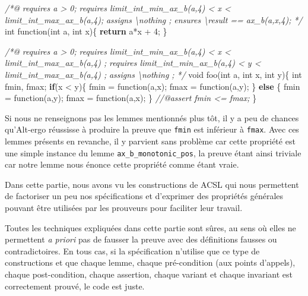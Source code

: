 \documentclass[12pt,francais,]{scrbook}
\newenvironment{Shaded}{}{}
\newcommand{\KeywordTok}[1]{\textcolor[rgb]{0.00,0.44,0.13}{\textbf{{#1}}}}
\newcommand{\DataTypeTok}[1]{\textcolor[rgb]{0.56,0.13,0.00}{{#1}}}
\newcommand{\DecValTok}[1]{\textcolor[rgb]{0.25,0.63,0.44}{{#1}}}
\newcommand{\CommentTok}[1]{\textcolor[rgb]{0.38,0.63,0.69}{\textit{{#1}}}}
\newcommand{\NormalTok}[1]{{#1}}
\begin{document}
\begin{footnotesize}\begin{Shaded}
\begin{Highlighting}[]
\CommentTok{/*@}
\CommentTok{  requires a > 0;}
\CommentTok{  requires limit_int_min_ax_b(a,4) < x < limit_int_max_ax_b(a,4);}
\CommentTok{  assigns \textbackslash{}nothing ;}
\CommentTok{  ensures \textbackslash{}result == ax_b(a,x,4);}
\CommentTok{*/}
\DataTypeTok{int} \NormalTok{function(}\DataTypeTok{int} \NormalTok{a, }\DataTypeTok{int} \NormalTok{x)\{}
  \KeywordTok{return} \NormalTok{a*x + }\DecValTok{4}\NormalTok{;}
\NormalTok{\}}

\CommentTok{/*@ }
\CommentTok{  requires a > 0;}
\CommentTok{  requires limit_int_min_ax_b(a,4) < x < limit_int_max_ax_b(a,4) ;}
\CommentTok{  requires limit_int_min_ax_b(a,4) < y < limit_int_max_ax_b(a,4) ;}
\CommentTok{  assigns \textbackslash{}nothing ;}
\CommentTok{*/}
\DataTypeTok{void} \NormalTok{foo(}\DataTypeTok{int} \NormalTok{a, }\DataTypeTok{int} \NormalTok{x, }\DataTypeTok{int} \NormalTok{y)\{}
  \DataTypeTok{int} \NormalTok{fmin, fmax;}
  \KeywordTok{if}\NormalTok{(x < y)\{}
    \NormalTok{fmin = function(a,x);}
    \NormalTok{fmax = function(a,y);}
  \NormalTok{\} }\KeywordTok{else} \NormalTok{\{}
    \NormalTok{fmin = function(a,y);}
    \NormalTok{fmax = function(a,x);}
  \NormalTok{\}}
  \CommentTok{//@assert fmin <= fmax;}
\NormalTok{\}}
\end{Highlighting}
\end{Shaded}\end{footnotesize}

Si nous ne renseignons pas les lemmes mentionnés plus tôt, il y a peu de
chances qu'Alt-ergo réussisse à produire la preuve que \texttt{fmin} est
inférieur à \texttt{fmax}. Avec ces lemmes présents en revanche, il y
parvient sans problème car cette propriété est une simple instance du
lemme \texttt{ax\_b\_monotonic\_pos}, la preuve étant ainsi triviale car
notre lemme nous énonce cette propriété comme étant vraie.

Dans cette partie, nous avons vu les constructions de ACSL qui nous
permettent de factoriser un peu nos spécifications et d'exprimer des
propriétés générales pouvant être utilisées par les prouveurs pour
faciliter leur travail.

Toutes les techniques expliquées dans cette partie sont sûres, au sens
où elles ne permettent \emph{a priori} pas de fausser la preuve avec des
définitions fausses ou contradictoires. En tous cas, si la spécification
n'utilise que ce type de constructions et que chaque lemme, chaque
pré-condition (aux points d'appels), chaque post-condition, chaque
assertion, chaque variant et chaque invariant est correctement prouvé,
le code est juste.
\end{document}

